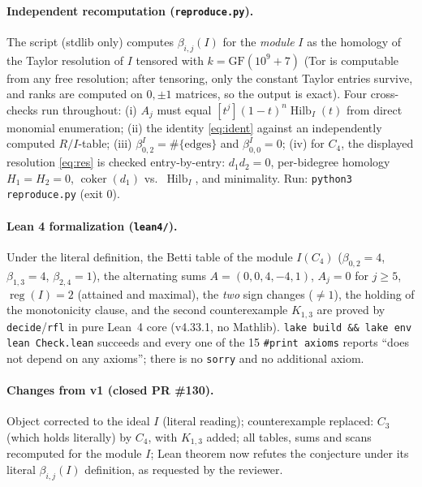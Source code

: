 \documentclass[11pt]{article}
\begin{document}
\paragraph{Independent recomputation (\texttt{reproduce.py}).}
The script (stdlib only) computes $\beta_{i,j}(I)$ for the \emph{module}
$I$ as the homology of the Taylor resolution of $I$ tensored with
$k=\mathrm{GF}(10^9{+}7)$ (Tor is computable from any free resolution;
after tensoring, only the constant Taylor entries survive, and ranks are
computed on $0,\pm1$ matrices, so the output is exact).  Four
cross-checks run throughout: (i) $A_j$ must equal
$[t^j](1-t)^n\operatorname{Hilb}_I(t)$ from direct monomial enumeration;
(ii) the identity \eqref{eq:ident} against an independently computed
$R/I$-table; (iii) $\beta^I_{0,2}=\#\{\text{edges}\}$ and
$\beta^I_{0,0}=0$; (iv) for $C_4$, the displayed resolution
\eqref{eq:res} is checked entry-by-entry: $d_1d_2=0$, per-bidegree
homology $H_1=H_2=0$, $\operatorname{coker}(d_1)$ vs.\ $\operatorname{Hilb}_I$,
and minimality.  Run: \texttt{python3 reproduce.py} (exit 0).

\paragraph{Lean 4 formalization (\texttt{lean4/}).}
Under the literal definition, the Betti table of the module $I(C_4)$
($\beta_{0,2}=4$, $\beta_{1,3}=4$, $\beta_{2,4}=1$), the alternating sums
$A=(0,0,4,-4,1)$, $A_j=0$ for $j\ge5$, $\operatorname{reg}(I)=2$ (attained
and maximal), the \emph{two} sign changes ($\neq1$), the holding of the
monotonicity clause, and the second counterexample $K_{1,3}$ are proved by
\texttt{decide}/\texttt{rfl} in pure Lean~4 core (v4.33.1, no Mathlib).
\texttt{lake build \&\& lake env lean Check.lean} succeeds and every one of
the 15 \texttt{\#print axioms} reports ``does not depend on any axioms'';
there is no \texttt{sorry} and no additional axiom.

\paragraph{Changes from v1 (closed PR \#130).}
Object corrected to the ideal $I$ (literal reading); counterexample
replaced: $C_3$ (which holds literally) by $C_4$, with $K_{1,3}$ added;
all tables, sums and scans recomputed for the module $I$; Lean theorem now
refutes the conjecture under its literal $\beta_{i,j}(I)$ definition, as
requested by the reviewer.
\end{document}
